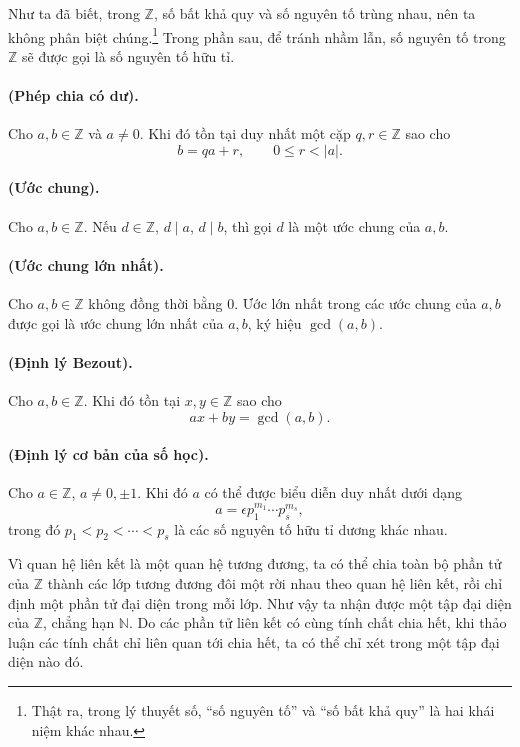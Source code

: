 \documentclass[11pt]{article}
\begin{document}
Như ta đã biết, trong \(\mathbb Z\), số bất khả quy và số nguyên tố trùng
nhau, nên ta không phân biệt chúng.\footnote{Thật ra, trong lý thuyết số, ``số
nguyên tố'' và ``số bất khả quy'' là hai khái niệm khác nhau.} Trong phần
sau, để tránh nhầm lẫn, số nguyên tố trong \(\mathbb Z\) sẽ được gọi là số
nguyên tố hữu tỉ.

\paragraph{ (Phép chia có dư).}
Cho \(a,b\in\mathbb Z\) và \(a\ne0\). Khi đó tồn tại duy nhất một cặp
\(q,r\in\mathbb Z\) sao cho
\[
  b=qa+r,\qquad 0\le r<|a|.
\]

\paragraph{ (Ước chung).}
Cho \(a,b\in\mathbb Z\). Nếu \(d\in\mathbb Z\), \(d\mid a\), \(d\mid b\), thì
gọi \(d\) là một ước chung của \(a,b\).

\paragraph{ (Ước chung lớn nhất).}
Cho \(a,b\in\mathbb Z\) không đồng thời bằng \(0\). Ước lớn nhất trong các
ước chung của \(a,b\) được gọi là ước chung lớn nhất của \(a,b\), ký hiệu
\(\gcd(a,b)\).

\paragraph{ (Định lý Bezout).}
Cho \(a,b\in\mathbb Z\). Khi đó tồn tại \(x,y\in\mathbb Z\) sao cho
\[
  ax+by=\gcd(a,b).
\]

\paragraph{ (Định lý cơ bản của số học).}
Cho \(a\in\mathbb Z\), \(a\ne0,\pm1\). Khi đó \(a\) có thể được biểu diễn duy
nhất dưới dạng
\[
  a=\epsilon p_1^{m_1}\cdots p_s^{m_s},
\]
trong đó \(p_1<p_2<\cdots<p_s\) là các số nguyên tố hữu tỉ dương khác nhau.

Vì quan hệ liên kết là một quan hệ tương đương, ta có thể chia toàn bộ phần
tử của \(\mathbb Z\) thành các lớp tương đương đôi một rời nhau theo quan hệ
liên kết, rồi chỉ định một phần tử đại diện trong mỗi lớp. Như vậy ta nhận
được một tập đại diện của \(\mathbb Z\), chẳng hạn \(\mathbb N\). Do các phần
tử liên kết có cùng tính chất chia hết, khi thảo luận các tính chất chỉ liên
quan tới chia hết, ta có thể chỉ xét trong một tập đại diện nào đó.
\end{document}
